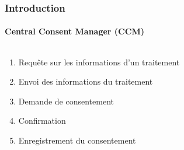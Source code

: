 \documentclass[aspectratio=169]{beamer}
\begin{document}
\begin{frame}
    \frametitle{Introduction}
    \framesubtitle{Central Consent Manager (CCM)}
    \begin{columns}
        \begin{column}{.45\textwidth}
            \parbox[c][0.8\textheight][c]{\columnwidth}{
                \begin{center}
                    \begin{enumerate}
                        \item<2-> Requête sur les informations d'un traitement
                        \item<3-> Envoi des informations du traitement
                        \item<4-> Demande de consentement
                        \item<5-> Confirmation
                        \item<6-> Enregistrement du consentement
                    \end{enumerate}
                \end{center}
            }
        \end{column}
        \begin{column}{.5\textwidth}
            \parbox[c][0.8\textheight][c]{\columnwidth}{
                \begin{center}

\end{center}}
\end{column}
\end{columns}
\end{frame}
\end{document}
